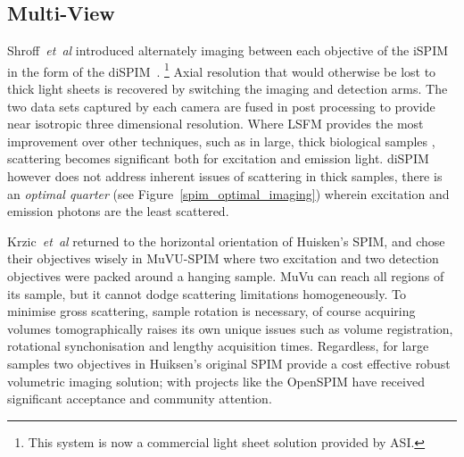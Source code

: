 


\subsection{Multi-View}%

Shroff~\emph{et~al} introduced alternately imaging between each objective of the iSPIM in the form of the diSPIM~\cite{kumar_dual-view_2014}. %
\footnote{This system is now a commercial light sheet solution provided by ASI.}
Axial resolution that would otherwise be lost to thick light sheets is recovered by switching the imaging and detection arms.
The two data sets captured by each camera are fused in post processing to provide near isotropic three dimensional resolution.
Where LSFM provides the most improvement over other techniques, such as in large, thick biological samples
, scattering becomes significant both for excitation and emission light.
diSPIM however does not address inherent issues of scattering in thick samples, there is an \emph{optimal quarter} (see Figure~\ref{spim_optimal_imaging}) wherein excitation and emission photons are the least scattered.

Krzic~\emph{et~al} returned to the horizontal orientation of Huisken's SPIM, and chose their objectives wisely in MuVU-SPIM where two excitation and two detection objectives were packed around a hanging sample.
MuVu can reach all regions of its sample, but it cannot dodge scattering limitations homogeneously.
To minimise gross scattering, sample rotation is necessary, of course acquiring volumes tomographically raises its own unique issues such as volume registration, rotational synchonisation and lengthy acquisition times.
Regardless, for large samples two objectives in Huiksen's original SPIM provide a cost effective robust volumetric imaging solution; with projects like the OpenSPIM have received significant acceptance and community attention.

